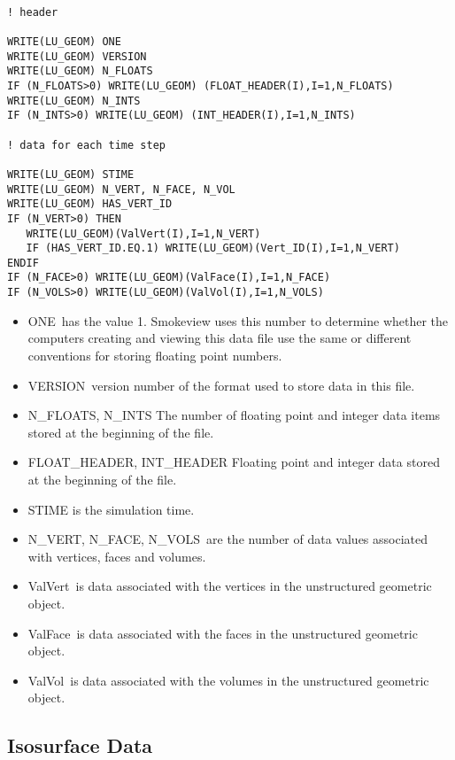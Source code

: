 \documentclass[12pt]{article}
\begin{document}
\begin{lstlisting}

! header

WRITE(LU_GEOM) ONE
WRITE(LU_GEOM) VERSION
WRITE(LU_GEOM) N_FLOATS
IF (N_FLOATS>0) WRITE(LU_GEOM) (FLOAT_HEADER(I),I=1,N_FLOATS)
WRITE(LU_GEOM) N_INTS
IF (N_INTS>0) WRITE(LU_GEOM) (INT_HEADER(I),I=1,N_INTS)

! data for each time step

WRITE(LU_GEOM) STIME
WRITE(LU_GEOM) N_VERT, N_FACE, N_VOL
WRITE(LU_GEOM) HAS_VERT_ID
IF (N_VERT>0) THEN
   WRITE(LU_GEOM)(ValVert(I),I=1,N_VERT)
   IF (HAS_VERT_ID.EQ.1) WRITE(LU_GEOM)(Vert_ID(I),I=1,N_VERT)
ENDIF
IF (N_FACE>0) WRITE(LU_GEOM)(ValFace(I),I=1,N_FACE)
IF (N_VOLS>0) WRITE(LU_GEOM)(ValVol(I),I=1,N_VOLS)

\end{lstlisting}

\begin{itemize}
\item {\ct ONE}\ has the value 1. Smokeview uses this number to determine whether the computers creating and viewing this data file use the same or different conventions for storing floating point numbers.
\item {\ct VERSION}\ version number of the format used to store data in this file.
\item {\ct N\_FLOATS, N\_INTS} The number of floating point and integer data items stored at the beginning of the file.
\item {\ct FLOAT\_HEADER, INT\_HEADER} Floating point and integer data stored at the beginning of the file.
\item {\ct STIME} is the simulation time.
\item {\ct N\_VERT, N\_FACE, N\_VOLS}\ are the number of data values associated with vertices, faces and volumes.
\item {\ct ValVert}\ is data associated with the vertices in the unstructured geometric object.
\item {\ct ValFace}\ is data associated with the faces in the unstructured geometric object.
\item {\ct ValVol}\ is data associated with the volumes in the unstructured geometric object.
\end{itemize}

\subsection{Isosurface Data}
\label{out:ISOSURFACE}
\end{document}
